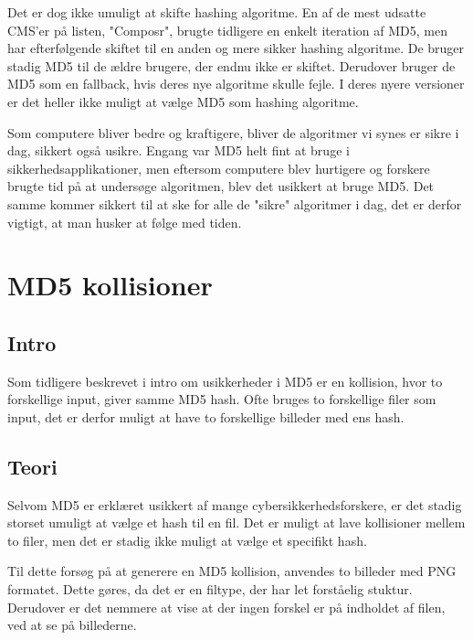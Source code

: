 \documentclass[12pt]{article}
\begin{document}
Det er dog ikke umuligt at skifte hashing algoritme. En af de mest udsatte CMS'er på listen, "Composr", brugte tidligere en enkelt iteration af MD5, men har efterfølgende skiftet til en anden og mere sikker hashing algoritme. De bruger stadig MD5 til de ældre brugere, der endnu ikke er skiftet. Derudover bruger de MD5 som en fallback, hvis deres nye algoritme skulle fejle. I deres nyere versioner er det heller ikke muligt at vælge MD5 som hashing algoritme. \cite{noauthor_composr_nodate}

Som computere bliver bedre og kraftigere, bliver de algoritmer vi synes er sikre i dag, sikkert også usikre. Engang var MD5 helt fint at bruge i sikkerhedsapplikationer, men eftersom computere blev hurtigere og forskere brugte tid på at undersøge algoritmen, blev det usikkert at bruge MD5. Det samme kommer sikkert til at ske for alle de "sikre" algoritmer i dag, det er derfor vigtigt, at man husker at følge med tiden.

\section{MD5 kollisioner}
\subsection{Intro}
Som tidligere beskrevet i intro om usikkerheder i MD5 er en kollision, hvor to forskellige input, giver samme MD5 hash. Ofte bruges to forskellige filer som input, det er derfor muligt at have to forskellige billeder med ens hash.  

\subsection{Teori}
Selvom MD5 er erklæret usikkert af mange cybersikkerhedsforskere, er det stadig storset umuligt at vælge et hash til en fil. Det er muligt at lave kollisioner mellem to filer, men det er stadig ikke muligt at vælge et specifikt hash. \cite{noauthor_hash_2022}



Til dette forsøg på at generere en MD5 kollision, anvendes to billeder med PNG formatet. Dette gøres, da det er en filtype, der har let forståelig stuktur\footnotemark[8]. Derudover er det nemmere at vise at der ingen forskel er på indholdet af filen, ved at se på billederne. 
\end{document}
